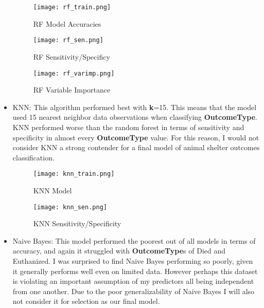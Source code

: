 \documentclass[12pt]{article} %
\begin{document}
\begin{itemize}
\begin{figure}[h!]
  \centering
  \texttt{[image: rf\_train.png]}                  
  \caption{RF Model Accuracies}
  \label{fig:RF Model}
\end{figure}

\begin{figure}[h!]
  \centering
  \texttt{[image: rf\_sen.png]}                  
  \caption{RF Sensitivity/Specificy}
  \label{fig:RF Model}
\end{figure}

\begin{figure}[h!]
  \centering
  \texttt{[image: rf\_varimp.png]}                  
  \caption{RF Variable Importance}
  \label{fig:RF Model}
\end{figure}

\vspace*{5 cm}


\item KNN: This algorithm performed best with \textbf{k}=15. This means that the model used 15 nearest neighbor data observations when classifying \textbf{OutcomeType}. KNN performed worse than the random forest in terms of sensitivity and specificity in almost every \textbf{OutcomeType} value. For this reason, I would not consider KNN a strong contender for a final model of animal shelter outcomes classification. 

\begin{figure}[h!]
  \centering
  \texttt{[image: knn\_train.png]}                  
  \caption{KNN Model}
  \label{fig:KNN Model}
\end{figure}

\begin{figure}[h!]
  \centering
  \texttt{[image: knn\_sen.png]}                  
  \caption{KNN Sensitivity/Specificity}
  \label{fig:DecisionTree}
\end{figure}

\vspace*{3 cm}

\item Naive Bayes: This model performed the poorest out of all models in terms of accuracy, and again it struggled with \textbf{OutcomeType}s of Died and Euthanized. I was surprised to find Naive Bayes performing so poorly, given it generally performs well even on limited data. However perhaps this dataset is violating an important assumption of my predictors all being independent from one another. Due to the poor generalizability of Naive Bayes I will also not consider it for selection as our final model. 


\end{itemize}
\end{document}
